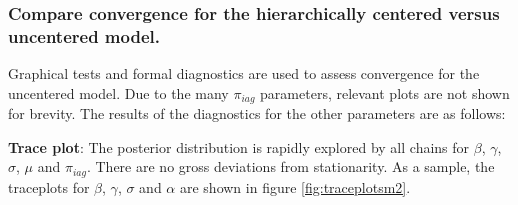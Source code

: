 \documentclass[12pt]{article}
\begin{document}
\subsubsection{ Compare convergence for the hierarchically centered versus uncentered model.}


Graphical tests and formal diagnostics are used to assess convergence for the uncentered model.  Due to the many $\pi_{iag}$ parameters, relevant plots are not shown for brevity. The results of the diagnostics for the other parameters are as follows:

\textbf{Trace plot}: The posterior distribution is rapidly explored by all chains for $\beta$, $\gamma$, $\sigma$, $\mu$ and $\pi_{iag}$. There are no gross deviations from stationarity. As a sample, the traceplots for $\beta$, $\gamma$, $\sigma$ and $\alpha$ are shown in figure \ref{fig:traceplotsm2}.
\end{document}
